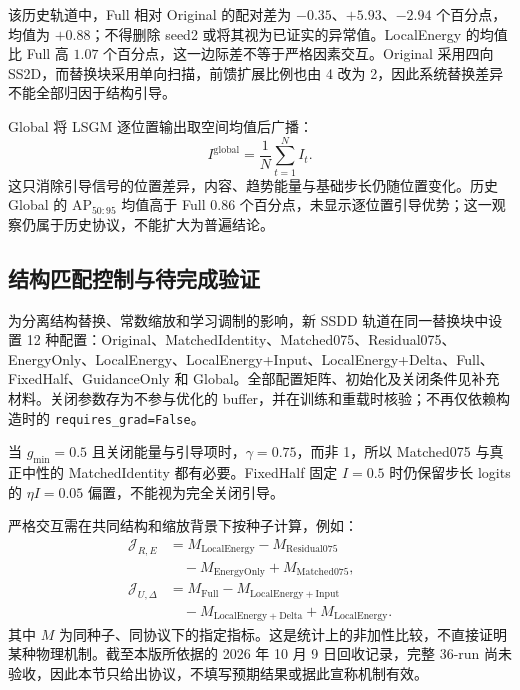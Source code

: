 该历史轨道中，Full 相对 Original 的配对差为 $-0.35$、$+5.93$、$-2.94$ 个百分点，均值为 $+0.88$；不得删除 seed2 或将其视为已证实的异常值。LocalEnergy 的均值比 Full 高 $1.07$ 个百分点，这一边际差不等于严格因素交互。Original 采用四向 SS2D，而替换块采用单向扫描，前馈扩展比例也由 4 改为 2，因此系统替换差异不能全部归因于结构引导。

Global 将 LSGM 逐位置输出取空间均值后广播：
\begin{equation}
I^{\mathrm{global}}=\frac{1}{N}\sum_{t=1}^{N}I_t.
\end{equation}
这只消除引导信号的位置差异，内容、趋势能量与基础步长仍随位置变化。历史 Global 的 AP$_{50:95}$ 均值高于 Full $0.86$ 个百分点，未显示逐位置引导优势；这一观察仍属于历史协议，不能扩大为普遍结论。
\FloatBarrier

\subsection{结构匹配控制与待完成验证}
为分离结构替换、常数缩放和学习调制的影响，新 SSDD 轨道在同一替换块中设置 12 种配置：Original、MatchedIdentity、Matched075、Residual075、EnergyOnly、LocalEnergy、LocalEnergy+Input、LocalEnergy+Delta、Full、FixedHalf、GuidanceOnly 和 Global。全部配置矩阵、初始化及关闭条件见补充材料。关闭参数存为不参与优化的 buffer，并在训练和重载时核验；不再仅依赖构造时的 \texttt{requires\_grad=False}。

当 $g_{\min}=0.5$ 且关闭能量与引导项时，$\gamma=0.75$，而非 1，所以 Matched075 与真正中性的 MatchedIdentity 都有必要。FixedHalf 固定 $I=0.5$ 时仍保留步长 logits 的 $\eta I=0.05$ 偏置，不能视为完全关闭引导。

严格交互需在共同结构和缩放背景下按种子计算，例如：
\begin{equation}
\begin{aligned}
\mathcal{J}_{R,E}
&=M_{\mathrm{LocalEnergy}}-M_{\mathrm{Residual075}}\\
&\quad-M_{\mathrm{EnergyOnly}}+M_{\mathrm{Matched075}},\\
\mathcal{J}_{U,\Delta}
&=M_{\mathrm{Full}}-M_{\mathrm{LocalEnergy+Input}}\\
&\quad-M_{\mathrm{LocalEnergy+Delta}}+M_{\mathrm{LocalEnergy}}.
\end{aligned}
\end{equation}
其中 $M$ 为同种子、同协议下的指定指标。这是统计上的非加性比较，不直接证明某种物理机制。截至本版所依据的 2026 年 10 月 9 日回收记录，完整 36-run 尚未验收，因此本节只给出协议，不填写预期结果或据此宣称机制有效。

